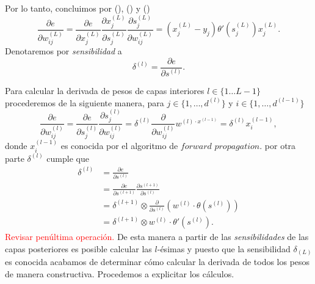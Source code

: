Por lo tanto, concluimos por 
(),
()
y  
()
\begin{equation}
    \frac{\partial{e}}{\partial w^{(L)}_{i j}}
     = 
     \frac{\partial{e}}{\partial x^{(L)}_j} 
     \frac{\partial x^{(L)}_j}{\partial s^{(L)}_j} 
     \frac{\partial s^{(L)}_j}{\partial w^{(L)}_{i j}} 
    =
    \left( x^{(L)}_j - y_j \right) 
    \theta' \left( s^{(L)}_j\right)
    x^{(L)}_j.
\end{equation}
Denotaremos por \textit{sensibilidad} a 
\begin{equation}
    \delta^{(l)} = \frac{\partial e}{ \partial s^{(l)}}.
\end{equation}

Para calcular la derivada de pesos de capas interiores 
$l \in \{1 \ldots L-1\}$
procederemos de la siguiente manera, para 
$j \in \{1, \ldots , d^{(l)}\}$ y 
$i \in \{1, \ldots , d^{(l-1)}\}$ 
\begin{equation}
    \frac{\partial{e}}{\partial w^{(l)}_{i j}}
     = 
     \frac{\partial e}{\partial s^{(l)}_j} 
     \frac{\partial s^{(l)}_j}{\partial w^{(l)}_{i j}}
    = 
    \delta^{(l)}
    \frac{\partial}{\partial w^{(l)}_{i j}}
    w^{(l) \cdot x^{(l-1)}}
    = 
    \delta^{(l)} x^{(l-1)}_i,
\end{equation}
donde  $x^{(l-1)}_i$ es conocida por el algoritmo de 
$\textit{forward propagation}$. por otra parte $\delta^{(l)}$ 
cumple que 
\begin{align}
    \delta^{(l)} 
    &= 
    \frac{\partial e}{\partial s^{(l)}}
    \\
    &= 
        \frac{\partial e}{\partial s^{(l+1)}}
        \frac{\partial s^{(l+1)}}{\partial s^{(l)}}
    \\
    &= 
    \delta^{(l+1)} 
    \otimes 
    \frac{\partial}{\partial s^{(l)}}
        \left( w^{(l)} \cdot \theta(s^{(l)})\right)
    \\
    &= 
    \delta^{(l+1)} 
    \otimes 
    w^{(l)} \cdot \theta'(s^{(l)}). 
\end{align}
\textcolor{red}{ Revisar penúltima operación.}
De esta manera a partir de las \textit{sensibilidades} de las 
capas posteriores es posible calcular las $l$-ésimas y puesto que 
la sensibilidad $\delta_{(L)}$ es conocida acabamos de determinar 
cómo calcular la derivada de todos los pesos  de manera constructiva. 
Procedemos a explicitar los cálculos. 

